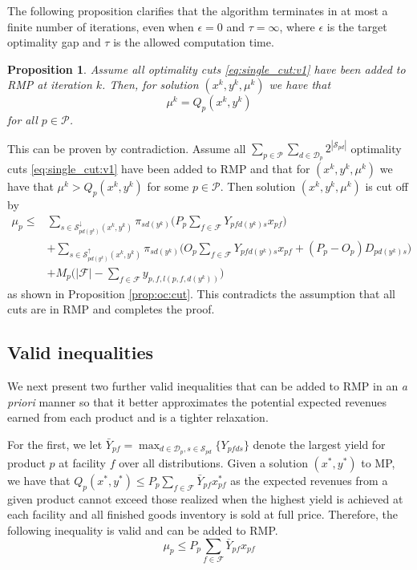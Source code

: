 \documentclass[12pt]{article}
\newtheorem{proposition}[theorem]{Proposition}%
\theoremstyle{thmstylethree}%
\newcommand{\mtc}[1] {\mathcal{#1}}
\begin{document}
The following proposition clarifies that the algorithm terminates in at most a finite number of iterations, even when $\epsilon=0$ and $\tau=\infty$, where $\epsilon$ is the target optimality gap and $\tau$ is the allowed computation time.

\begin{proposition}\label{prop:convergence}
Assume all optimality cuts \eqref{eq:single_cut:v1} have been added to RMP at iteration $k$. Then, for solution $(x^k,y^k,\mu^k)$ we have that
$$\mu^k=Q_p(x^k,y^k)$$
for all $p\in\mtc{P}$.
\end{proposition}
This can be proven by contradiction. Assume all $\sum_{p\in\mtc{P}}\sum_{d\in\mtc{D}_p}2^{|\mtc{S}_{pd}|}$ optimality cuts \eqref{eq:single_cut:v1} have been added to RMP and that for $(x^k,y^k,\mu^k)$ we have that
$\mu^k > Q_p(x^k,y^k)$ 
for some $p\in\mtc{P}$. Then solution $(x^k,y^k,\mu^k)$ is cut off by 
\begin{align*}
\mu_p \leq & \sum_{s \in \mathcal{S}^{\downarrow}_{pd(y^k)}(x^k,y^k)} \pi_{sd(y^k)} \bigg(P_p \sum_{f \in \mathcal{F}}Y_{pfd(y^k)s}x_{pf} \bigg) \\ \nonumber 
& +\sum_{s \in \mathcal{S}^{\uparrow}_{pd(y^k)}(x^k,y^k)} \pi_{sd(y^k)}\bigg(O_p\sum_{f\in\mathcal{F}}Y_{pfd(y^k)s}x_{pf}+(P_p-O_p)D_{pd(y^k)s}\bigg)\\
    \nonumber  &+ M_{p}\bigg(\vert \mathcal{F} \vert - \sum_{f \in \mathcal{F}} y_{p,f,l(p,f,d(y^k))}\bigg) 
\end{align*}
as shown in Proposition \ref{prop:oc:cut}. This contradicts the assumption that all cuts are in RMP and completes the proof. 
\endproof


\subsection{Valid inequalities}
\label{subsec:pos_overage_bound}
We next present two further valid inequalities that can be added to RMP in an \textit{a priori} manner so that it better approximates the potential expected revenues earned from each product and is a tighter relaxation. 

For the first, we let $\bar{Y}_{pf}=\max_{d\in\mathcal{D}_p,s\in\mathcal{S}_{pd}}\{Y_{pfds}\}$
denote the largest yield for product $p$ at facility $f$ over all distributions. 
Given a solution  $(x^*,y^*)$ to MP, we have that $Q_p(x^*,y^*)\leq P_p\sum_{f\in\mathcal{F}}\bar{Y}_{pf}x_{pf}^{*}$ as the expected revenues from a given product
cannot exceed those realized when the highest yield is achieved at each facility and all finished goods inventory is sold at full price. Therefore, the following inequality is valid and can be added to RMP.
\begin{equation}\label{eq:vi1}
    \mu_p\leq P_p\sum_{f\in\mathcal{F}}\bar{Y}_{pf}x_{pf}\tag{VI1}
\end{equation}  
\end{document}
